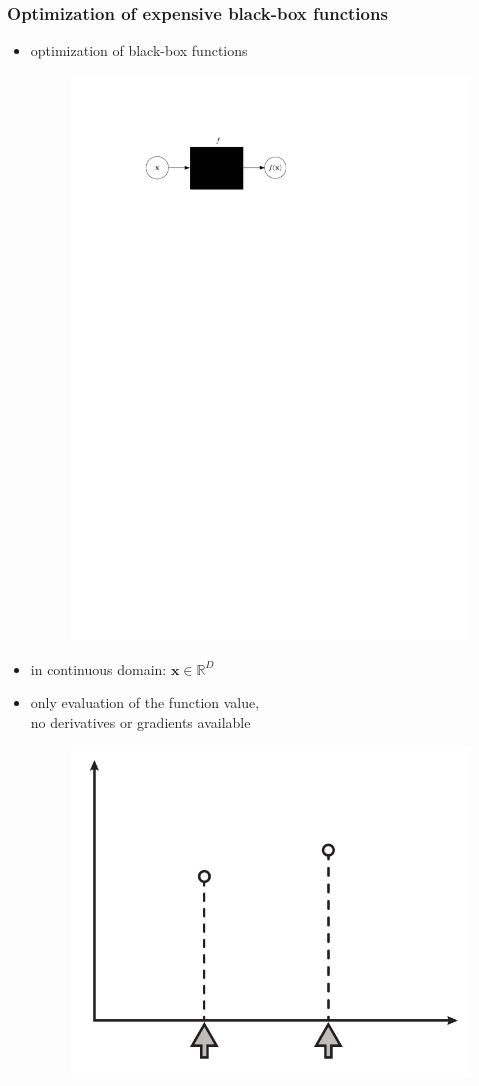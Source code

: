 \documentclass[sans,mathserif]{beamer}
\newcommand{\xx}{\mathrm{\mathbf{x}}}
\begin{document}
\begin{frame}
  \frametitle{Optimization of expensive black-box functions}
  \begin{itemize}[<+->]
    \item optimization of black-box functions
      \begin{figure}
      \includegraphics[width=0.6\linewidth]{img/black-box-function}
      \end{figure}
    \item in continuous domain: $\xx \in \mathbb{R}^D$
    \item only evaluation of the function value, \\
      \alert{no derivatives} or gradients available
      \begin{figure}
      \includegraphics[width=0.4\linewidth]{img/black-box-samples}
      \end{figure}
  \end{itemize}
\end{frame}
\end{document}
